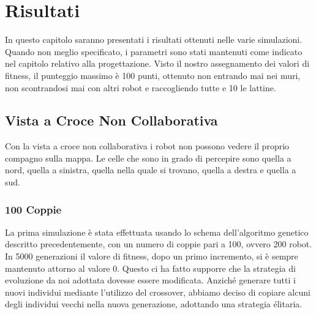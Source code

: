 \chapter{Risultati}
In questo capitolo saranno presentati i risultati ottenuti nelle varie
simulazioni. Quando non meglio specificato, i parametri sono stati mantenuti
come indicato nel capitolo relativo alla progettazione.\newline
Visto il nostro assegnamento dei valori di fitness, il punteggio massimo è 100
punti, ottenuto non entrando mai nei muri, non scontrandosi mai con altri robot
e raccogliendo tutte e 10 le lattine.



\section{Vista a Croce Non Collaborativa}
Con la vista a croce non collaborativa i robot non possono vedere il proprio
compagno sulla mappa. Le celle che sono in grado di percepire sono quella a
nord, quella a sinistra, quella nella quale si trovano, quella a destra e quella
a sud.

\subsection{100 Coppie}
La prima simulazione è stata effettuata usando lo schema dell'algoritmo genetico
descritto precedentemente, con un numero di coppie pari a 100, ovvero 200 robot.
In 5000 generazioni il valore di fitness, dopo un primo incremento, si è sempre
mantenuto attorno al valore 0. Questo ci ha fatto supporre che la strategia di
evoluzione da noi adottata dovesse essere modificata. Anziché generare tutti i
nuovi individui mediante l'utilizzo del crossover, abbiamo deciso di copiare
alcuni degli individui vecchi nella nuova generazione, adottando una strategia
élitaria.


